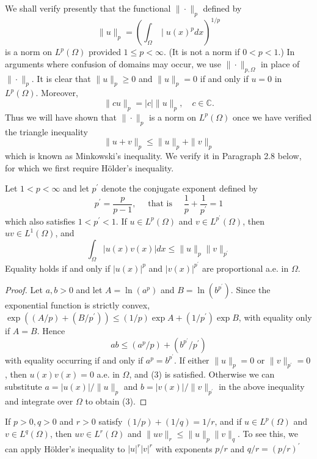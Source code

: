 \begin{para}
  We shall verify presently that the functional $\|\cdot\|_p$ defined by
  \[
  \|u\|_p=\left(\int_{\Omega} \mid u(x)^p d x\right)^{1 / p}
  \]
  is a norm on $L^p(\Omega)$ provided $1 \leq p<\infty$. (It is not a norm if $0<p<1$.) In arguments where confusion of domains may occur, we use $\|\cdot\|_{p, \Omega}$ in place of $\|\cdot\|_p$. It is clear that $\|u\|_p \geq 0$ and $\|u\|_p=0$ if and only if $u=0$ in $L^p(\Omega)$. Moreover,
  \[
  \|c u\|_p=|c|\|u\|_p, \quad c \in \mathbb{C} .
  \]
  Thus we will have shown that $\|\cdot\|_p$ is a norm on $L^p(\Omega)$ once we have verified the
  triangle inequality
  \[
  \|u+v\|_p \leq\|u\|_p+\|v\|_p
  \]
  which is known as Minkowski's inequality. We verify it in Paragraph 2.8 below, for which we first require Hölder's inequality.
\end{para}

\begin{theorem}
  Let $1<p<\infty$ and let $p^{\prime}$ denote the conjugate exponent defined by
  \[
  p^{\prime}=\frac{p}{p-1}, \quad \text { that is } \quad \frac{1}{p}+\frac{1}{p^{\prime}}=1
  \]
  which also satisfies $1<p^{\prime}<1$. If $u \in L^p(\Omega)$ and $v \in L^{p^{\prime}}(\Omega)$, then $u v \in L^1(\Omega)$, and
  \begin{equation}\label{eq:2.3}
    \int_{\Omega}|u(x) v(x)| d x \leq\|u\|_p\|v\|_{p^{\prime}}
  \end{equation}
  Equality holds if and only if $|u(x)|^p$ and $|v(x)|^{p^{\prime}}$ are proportional a.e. in $\Omega$.
\end{theorem}

\begin{proof}
  Let $a, b>0$ and let $A=\ln \left(a^p\right)$ and $B=\ln \left(b^{p^{\prime}}\right)$. Since the exponential function is strictly convex, $\exp \left((A / p)+\left(B / p^{\prime}\right)\right) \leq(1 / p) \exp A+\left(1 / p^{\prime}\right) \exp B$, with equality only if $A=B$. Hence
  \[
  a b \leq\left(a^p / p\right)+\left(b^{p^{\prime}} / p^{\prime}\right)
  \]
  with equality occurring if and only if $a^p=b^{p^{\prime}}$. If either $\|u\|_p=0$ or $\|v\|_{p^{\prime}}=0$, then $u(x) v(x)=0$ a.e. in $\Omega$, and (3) is satisfied. Otherwise we can substitute $a=|u(x)| /\|u\|_p$ and $b=|v(x)| /\|v\|_{p^{\prime}}$ in the above inequality and integrate over $\Omega$ to obtain (3).
\end{proof}

\begin{corollary}
  If $p>0, q>0$ and $r>0$ satisfy $(1 / p)+(1 / q)=1 / r$, and if $u \in L^p(\Omega)$ and $v \in L^q(\Omega)$, then $u v \in L^r(\Omega)$ and $\|u v\|_r \leq\|u\|_p\|v\|_q$. To see this, we can apply Hölder's inequality to $|u|^r|v|^r$ with exponents $p / r$ and $q / r=(p / r)^{\prime}$
\end{corollary}

